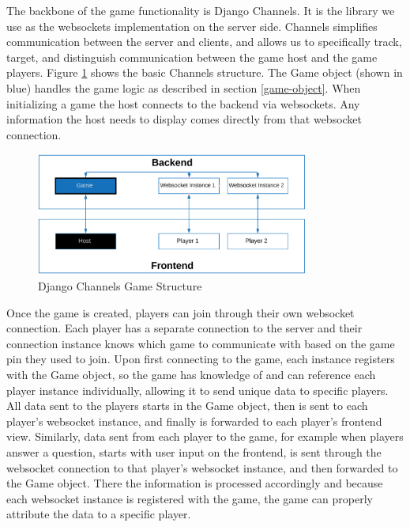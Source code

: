 \documentclass{article}
\begin{document}
	        The backbone of the game functionality is Django Channels. It is the library we use as the websockets implementation on the server side. Channels simplifies communication between the server and clients, and allows us to specifically track, target, and distinguish communication between the game host and the game players. Figure \ref{fig:backend-libraries_channels} shows the basic Channels structure. The Game object (shown in blue) handles the game logic as described in section \ref{game-object}.  When initializing a game the host connects to the backend via websockets. Any information the host needs to display comes directly from that websocket connection.

            \begin{figure}[ht]
                \centering
                \includegraphics[width=0.8\textwidth]{images/backend-libraries_channels.png}
                \caption{Django Channels Game Structure}
                \label{fig:backend-libraries_channels}
            \end{figure}
            
	        Once the game is created, players can join through their own websocket connection. Each player has a separate connection to the server and their connection instance knows which game to communicate with based on the game pin they used to join. Upon first connecting to the game, each instance registers with the Game object, so the game has knowledge of and can reference each player instance individually, allowing it to send unique data to specific players. All data sent to the players starts in the Game object, then is sent to each player's websocket instance, and finally is forwarded to each player's frontend view. Similarly, data sent from each player to the game, for example when players answer a question, starts with user input on the frontend, is sent through the websocket connection to that player's websocket instance, and then forwarded to the Game object. There the information is processed accordingly and because each websocket instance is registered with the game, the game can properly attribute the data to a specific player.
	        \smallskip
	        
\end{document}
